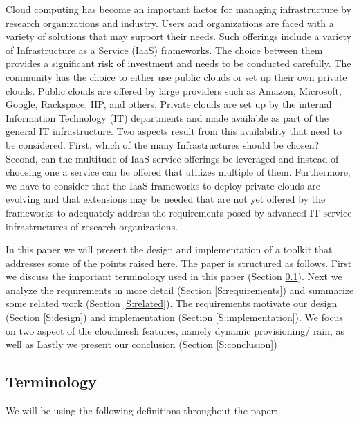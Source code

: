 \documentclass{tex/sig-alternate-2013}
\newcommand{\todo}[1]{{\color{red}{#1}}}
\begin{document}
Cloud computing has become an important factor for managing infrastructure by research organizations and industry. Users and organizations are faced with a variety of solutions that may support their needs. Such offerings include a variety of Infrastructure as a Service (IaaS) frameworks. The choice between them provides a significant risk of investment and needs to be conducted carefully. The community has the choice to either use public clouds or set up their own private clouds. Public clouds are offered by large providers such as Amazon, Microsoft, Google, Rackspace, HP, and others. Private clouds are set up by the internal Information Technology (IT) departments and made available as part of the general IT infrastructure. Two aspects result from this availability that need to be considered. First, which of the many Infrastructures should be chosen? Second, can the multitude of IaaS service offerings be leveraged and instead of choosing one a service can be offered that utilizes multiple of them. Furthermore, we have to consider that the IaaS frameworks to deploy private clouds are evolving and that extensions may be needed that are not yet offered by the frameworks to adequately address the requirements posed by advanced IT service infrastructures of research organizations.

In this paper we will present the design and implementation of a toolkit that addresses some of the points raised here.  The paper is structured as follows. First we discuss the important terminology used in this paper (Section \ref{S:terminology}).  Next we analyze the requirements in more detail (Section \ref{S:requirements}) and summarize some related work (Section \ref{S:related}).  The requirements motivate our design (Section \ref{S:design}) and implementation (Section \ref{S:implementation}).  We focus on two aspect of the cloudmesh features, namely dynamic provisioning/ rain, as well as Lastly we present our conclusion (Section \ref{S:conclusion})

\subsection{Terminology} \label{S:terminology}

\todo{READ}
We will be using the following definitions throughout the paper:
\end{document}
